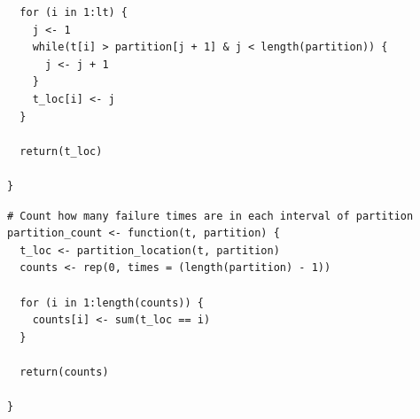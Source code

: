 \documentclass[11pt,a4paper]{article}
\begin{document}
\begin{appendices}
\begin{lstlisting}
  for (i in 1:lt) {
    j <- 1
    while(t[i] > partition[j + 1] & j < length(partition)) {
      j <- j + 1
    }
    t_loc[i] <- j
  }

  return(t_loc)

}
\end{lstlisting}

\begin{lstlisting}
# Count how many failure times are in each interval of partition
partition_count <- function(t, partition) {
  t_loc <- partition_location(t, partition)
  counts <- rep(0, times = (length(partition) - 1))

  for (i in 1:length(counts)) {
    counts[i] <- sum(t_loc == i)
  }

  return(counts)

}
\end{lstlisting}

\end{appendices}


\end{document}
